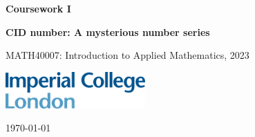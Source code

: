 \documentclass[10pt, a4paper]{article}
\begin{document}
\begin{titlepage}
    \begin{center}
        \vspace*{3cm}
            
        \Huge
        \textbf{
        Coursework I}
            
            
        \vspace{1.5cm}
        \Large
            
        \textbf{
        CID number: A mysterious number series}%
        
            
        \vfill
        
    MATH40007: Introduction to Applied Mathematics, 2023
        \vspace{1cm}
            
        \includegraphics[width=0.4\textwidth]{icl_logo.png}
        \\
        
        \Large
        
        \today
            
    \end{center}
\end{titlepage}
\end{document}
